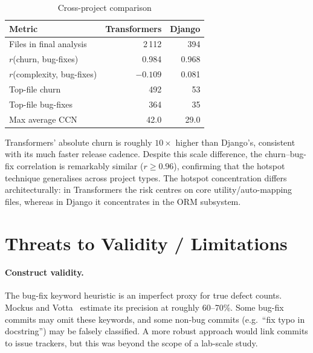 \documentclass[12pt,a4paper]{article}
\begin{document}
\begin{table}[!htb]
\centering
\caption{Cross-project comparison}
\label{tab:comparison}
\begin{tabular}{lrr}
\toprule
\textbf{Metric}                         & \textbf{Transformers} & \textbf{Django} \\
\midrule
Files in final analysis                  & 2\,112                & 394             \\
$r$(churn, bug-fixes)                    & 0.984                 & 0.968           \\
$r$(complexity, bug-fixes)               & $-0.109$              & 0.081           \\
Top-file churn                           & 492                   & 53              \\
Top-file bug-fixes                       & 364                   & 35              \\
Max average CCN                          & 42.0                  & 29.0            \\
\bottomrule
\end{tabular}
\end{table}

Transformers' absolute churn is roughly $10\times$ higher than Django's, consistent with its much faster release cadence.
Despite this scale difference, the churn--bug-fix correlation is remarkably similar ($r \geq 0.96$), confirming that the hotspot technique generalises across project types.
The hotspot concentration differs architecturally: in Transformers the risk centres on core utility/auto-mapping files, whereas in Django it concentrates in the ORM subsystem.

\section{Threats to Validity / Limitations}
\label{sec:threats}

\paragraph{Construct validity.}
The bug-fix keyword heuristic is an imperfect proxy for true defect counts.
Mockus and Votta~\cite{mockus2000} estimate its precision at roughly 60--70\%.
Some bug-fix commits may omit these keywords, and some non-bug commits (e.g.\ ``fix typo in docstring'') may be falsely classified.
A more robust approach would link commits to issue trackers, but this was beyond the scope of a lab-scale study.
\end{document}
